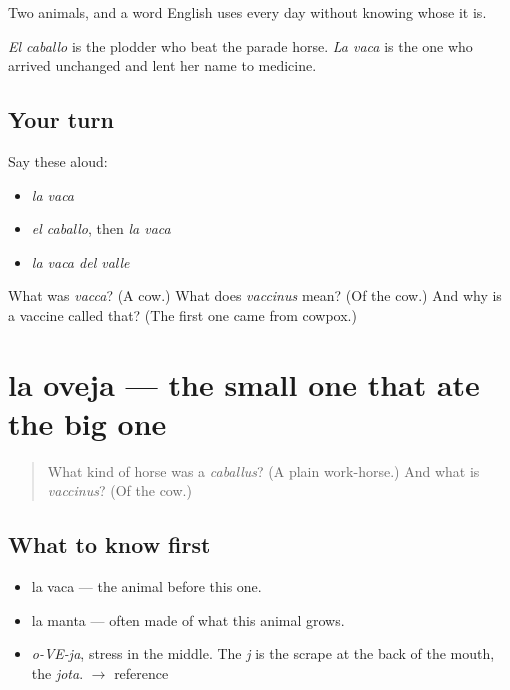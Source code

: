 \begin{grammarlens}[title={What you've built}]
Two animals, and a word English uses every day without knowing whose it is.

\emph{El caballo} is the plodder who beat the parade horse. \emph{La vaca} is the one who arrived unchanged and lent her name to medicine.
\end{grammarlens}

\subsection*{Your turn}
Say these aloud:

\begin{itemize}
\raggedright
  \item \emph{la vaca}
  \item \emph{el caballo}, then \emph{la vaca}
  \item \emph{la vaca del valle}
\end{itemize}

\begin{tcolorbox}[breakable,colback=teal!4,colframe=teal!35!black,title={Before you move on}]
What was \emph{vacca}? (A cow.) What does \emph{vaccinus} mean? (Of the cow.) And why is a vaccine called that? (The first one came from cowpox.)
\end{tcolorbox}
\section[la oveja]{la oveja — the small one that ate the big one}

\label{lesson:ES-C296-oveja}



\begin{quote}
What kind of horse was a \emph{caballus}? (A plain work-horse.) And what is \emph{vaccinus}? (Of the cow.)
\end{quote}

\subsection*{What to know first}
\begin{itemize}
\raggedright
  \item la vaca — the animal before this one.
  \item la manta — often made of what this animal grows.
\end{itemize}

\begin{sounds}
\begin{itemize}
\raggedright
  \item \emph{o-VE-ja}, stress in the middle. The \emph{j} is the scrape at the back of the mouth, the \emph{jota}. $\to$ reference
\end{itemize}
\end{sounds}

